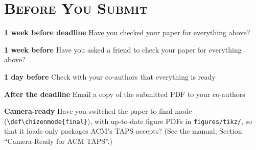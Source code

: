 \section*{\textsc{Before You Submit }}
\begin{checklist}
    \item \textbf{1 week before deadline} Have you checked your paper for everything above? 
    \item \textbf{1 week before} Have you asked a friend to check your paper for everything above? 
    \item \textbf{1 day before} Check with your co-authors that everything is ready
    \item \textbf{After the deadline} Email a copy of the submitted PDF to your co-authors
    \item \textbf{Camera-ready} Have you switched the paper to final mode (\texttt{\textbackslash def\textbackslash chizenmode\{final\}}), with up-to-date figure PDFs in \texttt{figures/tikz/}, so that it loads only packages ACM's TAPS accepts? (See the manual, Section ``Camera-Ready for ACM TAPS''.)
\end{checklist}






